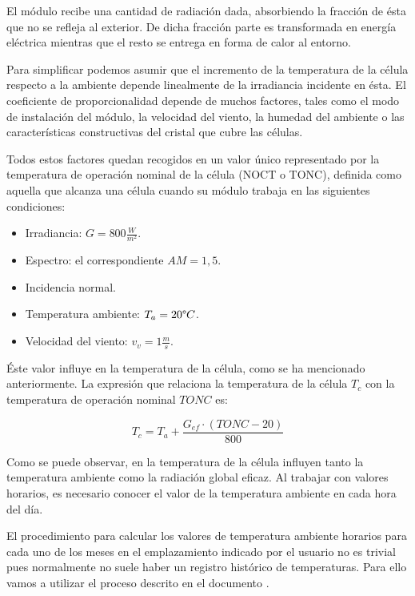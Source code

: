 El módulo recibe una cantidad de radiación dada, absorbiendo la fracción de ésta que no se refleja al exterior. De dicha fracción parte es transformada en energía eléctrica mientras que el resto se entrega en forma de calor al entorno.

Para simplificar podemos asumir que el incremento de la temperatura de la célula respecto a la ambiente depende linealmente de la irradiancia incidente en ésta. El coeficiente de proporcionalidad depende de muchos factores, tales como el modo de instalación del módulo, la velocidad del viento, la humedad del ambiente o las características constructivas del cristal que cubre las células.

Todos estos factores quedan recogidos en un valor único representado por la temperatura de operación nominal de la célula (NOCT o TONC), definida como aquella que alcanza una célula cuando su módulo trabaja en las siguientes condiciones:
\begin{itemize}
\item Irradiancia: $G=800 \frac{W}{m^2}$.
\item Espectro: el correspondiente $AM=1,5$.
\item Incidencia normal.
\item Temperatura ambiente: $T_a = 20 \degree C$.
\item Velocidad del viento:  $ v_v = 1 \frac{m}{s}$.
\end{itemize}

Éste valor influye en la temperatura de la célula, como se ha mencionado anteriormente. La expresión que relaciona la temperatura de la célula $T_c$ con la temperatura de operación nominal $TONC$ es:

\begin{equation}
\label{eqn:T_c}
T_c = T_a + \frac{G_{ef}\cdot(TONC - 20)}{800}
\end{equation}

Como se puede observar, en la temperatura de la célula influyen tanto la temperatura ambiente como la radiación global eficaz. Al trabajar con valores horarios, es necesario conocer el valor de la temperatura ambiente en cada hora del día.



El procedimiento para calcular los valores de temperatura ambiente horarios para cada uno de los meses en el emplazamiento indicado por el usuario no es trivial pues normalmente no suele haber un registro histórico de temperaturas. Para ello vamos a utilizar el proceso descrito en el documento \cite{temp_paper}.

